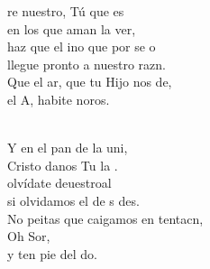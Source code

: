 \documentclass[12pt]{article}
\begin{document}
\begin{multicols*}{2}
\begin{cancion}%
	re nuestro, Tú que es \\
	en los que aman la ver,\\
	haz que el ino que por  se o\\
	llegue pronto a nuestro razn.\\
	Que el ar, que tu Hijo nos de, \\
	el A, habite noros.\\\jump\\
	\begin{chorus}%
	Y en el pan de la uni,\\
	Cristo danos Tu la .\\
	olvídate deuestroal\\
	si olvidamos el de s des. \\
	No peitas que caigamos en tentacn, \\
	Oh Sor,\\
	y ten pie del do.\\
	\end{chorus}%
	\jump\\
\end{cancion}%


\end{multicols*}
\end{document}
